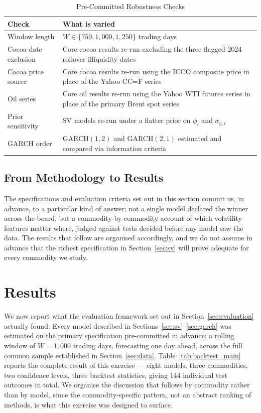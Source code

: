 \documentclass[preprint,12pt,authoryear]{elsarticle}
\begin{document}
\begin{table}[htbp]
\centering
\caption{Pre-Committed Robustness Checks}
\label{tab:robustness}
\small
\begin{tabular}{p{4cm} p{9cm}}
\toprule
Check & What is varied \\
\midrule
Window length & $W \in \{750, 1{,}000, 1{,}250\}$ trading days \\
Cocoa date exclusion & Core cocoa results re-run excluding the three flagged 2024 rollover-illiquidity dates \\
Cocoa price source & Core cocoa results re-run using the ICCO composite price in place of the Yahoo CC=F series \\
Oil series & Core oil results re-run using the Yahoo WTI futures series in place of the primary Brent spot series \\
Prior sensitivity & SV models re-run under a flatter prior on $\phi_i$ and $\sigma_{\eta,i}$ \\
GARCH order & GARCH$(1,2)$ and GARCH$(2,1)$ estimated and compared via information criteria \\
\bottomrule
\end{tabular}
\end{table}

\subsection{From Methodology to Results}

The specifications and evaluation criteria set out in this section commit us, in advance, to a particular kind of answer: not a single model declared the winner across the board, but a commodity-by-commodity account of which volatility features matter where, judged against tests decided before any model saw the data. The results that follow are organised accordingly, and we do not assume in advance that the richest specification in Section~\ref{sec:sv} will prove adequate for every commodity we study.
\section{Results}
\label{sec:results}

We now report what the evaluation framework set out in Section~\ref{sec:evaluation} actually found. Every model described in Sections~\ref{sec:sv}--\ref{sec:garch} was estimated on the primary specification pre-committed in advance: a rolling window of $W=1{,}000$ trading days, forecasting one day ahead, across the full common sample established in Section~\ref{sec:data}. Table~\ref{tab:backtest_main} reports the complete result of this exercise --- eight models, three commodities, two confidence levels, three backtest statistics, giving 144 individual test outcomes in total. We organise the discussion that follows by commodity rather than by model, since the commodity-specific pattern, not an abstract ranking of methods, is what this exercise was designed to surface.
\end{document}
